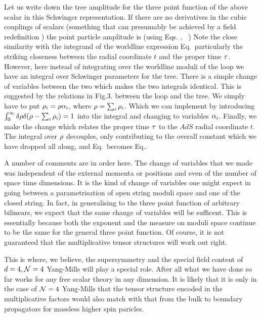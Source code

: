 Let us write down the tree amplitude for the three point function of the above scalar in this Schwinger
representation. If there are no derivatives in the cubic couplings of scalars (something that
can presumably be achieved by a field redefinition \lmrs ) the point particle amplitude is
(using Eqs. \usualk , \htk\ )
\eqn{}
Note the close similarity with the
integrand of the
worldline expression Eq.\posglue\ particularly the striking closeness between the
radial coordinate $t$ and the proper time ${\tau}$. However, here instead of integrating over 
the worldline moduli of the loop
we have an integral over Schwinger parameters for the tree. There is a simple
change of variables 
between the two which makes the two integrals identical. This is suggested by the relations in 
Fig.3. between the loop and the tree. We simply have to put ${\rho}_i={\rho}{\alpha}_i$, where ${\rho}=\sum_i{\rho}_i$.
Which we can implement by introducing $\int_0^{\infty}{\delta}{\rho}{\delta}({\rho}-\sum_i{\rho}_i)=1$ into the integral 
and changing to variables ${\alpha}_i$. Finally, we make the change
\eqn{}
which relates the proper time ${\tau}$ to the $AdS$ radial coordinate $t$. The integral over ${\rho}$ 
decouples, only contributing to the overall constant which we have dropped all along,
and  Eq.\threetree\ becomes Eq.\posglue .
   
A number of comments are in order here. The change of variables that we made was independent 
of the external momenta or positions and even of the number of space time dimensions. It is the 
kind of change of variables one might expect in going between a parametrisation of open string
moduli space and one of the closed string. 
In fact, in 
generalising to the three point function of arbitrary bilinears, we expect 
that the same change of variables will be sufficent. This is essentially because 
both the exponent and the measure on moduli space continue to be the
same for the general three point function. Of course, it is not guaranteed that the 
multiplicative tensor structures will work out right. 

This is where, we believe, the supersymmetry and the special field content of $d=4, {\cal N}=4$ 
Yang-Mills will play a special role. After all what we have done so far works for any free 
scalar theory in any dimension. 
It is likely that it is only in the case of ${\cal N}=4$ Yang-Mills that  
the tensor structure encoded in the multiplicative factors would also match with that
from the bulk to boundary propagators for massless higher spin paricles.

